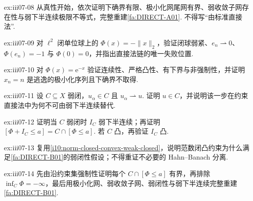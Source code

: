 \begin{FAExercise}[完整重建变分法直接法]{ex:iii07-08}
从真性开始，依次证明下确界有限、极小化网尾网有界、弱收敛子网存在性与弱下半连续极限不等式，完整重建\autoref{fa:DIRECT-A01}. 不得写“由标准直接法”.
\end{FAExercise}

\begin{FAExercise}[范数连续但非弱下半连续反例的复用]{ex:iii07-09}
对 \(\displaystyle\ell^2\) 闭单位球上的 \(\displaystyle\Phi(x)=-\|x\|_2\)，验证闭球弱紧、\(\displaystyle e_n\rightharpoonup0\)、\(\displaystyle\Phi(e_n)=-1\) 与 \(\displaystyle\Phi(0)=0\)，并指出直接法链的唯一失败位置.
\end{FAExercise}

\begin{FAExercise}[非强制性导致极小元逃逸反例的复用]{ex:iii07-10}
对 \(\displaystyle\Phi(x)=\mathrm{e}^{-x}\) 验证连续性、严格凸性、有下界与非强制性，并证明 \(\displaystyle x_n=n\) 是逃逸的极小化序列且下确界不取得.
\end{FAExercise}

\begin{FAExercise}[弱闭约束]{ex:iii07-11}
设 \(\displaystyle C\subseteq X\) 弱闭，\(\displaystyle u_\alpha\in C\) 且 \(\displaystyle u_\alpha\rightharpoonup u\). 证明 \(\displaystyle u\in C\)，并说明该一步在约束直接法中为何不可由弱下半连续替代.
\end{FAExercise}

\begin{FAExercise}[示性泛函]{ex:iii07-12}
证明当 \(\displaystyle C\) 弱闭时 \(\displaystyle I_C\) 弱下半连续；再证明 \(\displaystyle[\Phi+I_C\leqslant a]=C\cap[\Phi\leqslant a]\). 若 \(\displaystyle C\) 凸，再验证 \(\displaystyle I_C\) 凸.
\end{FAExercise}

\begin{FAExercise}[范数闭凸蕴含弱闭]{ex:iii07-13}
复用\autoref{i10:norm-closed-convex-weak-closed}，说明范数闭凸约束为什么满足\autoref{fa:DIRECT-B01}的弱闭性假设；不得重证不必要的 Hahn--Banach 分离.
\end{FAExercise}

\begin{FAExercise}[完整重建弱闭约束上的直接法]{ex:iii07-14}
先由沿约束集强制性证明每个 \(\displaystyle C\cap[\Phi\leqslant a]\) 有界，再排除 \(\displaystyle\inf_C\Phi=-\infty\)，最后用极小化网、弱收敛子网、弱闭性与弱下半连续完整重建\autoref{fa:DIRECT-B01}.
\end{FAExercise}

